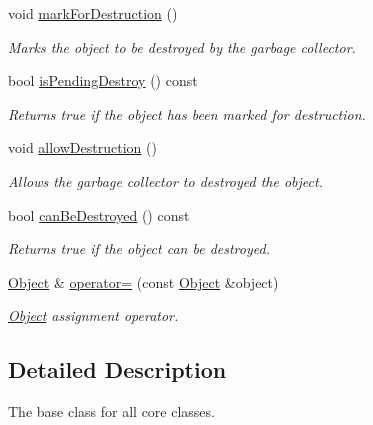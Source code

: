 \begin{DoxyCompactItemize}
void \mbox{\hyperlink{class_arcana_1_1_object_af08a90d6cc61992f2908e61b60a31972}{mark\+For\+Destruction}} ()
\begin{DoxyCompactList}\small\item\em Marks the object to be destroyed by the garbage collector. \end{DoxyCompactList}\item 
\mbox{\label{class_arcana_1_1_object_aa885d48e135268cc4198ccb550e151aa}} 
bool \mbox{\hyperlink{class_arcana_1_1_object_aa885d48e135268cc4198ccb550e151aa}{is\+Pending\+Destroy}} () const
\begin{DoxyCompactList}\small\item\em Returns true if the object has been marked for destruction. \end{DoxyCompactList}\item 
void \mbox{\hyperlink{class_arcana_1_1_object_abd84158043b5d90a1f1c5647c0f04b9f}{allow\+Destruction}} ()
\begin{DoxyCompactList}\small\item\em Allows the garbage collector to destroyed the object. \end{DoxyCompactList}\item 
\mbox{\label{class_arcana_1_1_object_a2cbe52bfff3d3c70e35a5de48d7081d4}} 
bool \mbox{\hyperlink{class_arcana_1_1_object_a2cbe52bfff3d3c70e35a5de48d7081d4}{can\+Be\+Destroyed}} () const
\begin{DoxyCompactList}\small\item\em Returns true if the object can be destroyed. \end{DoxyCompactList}\item 
\mbox{\label{class_arcana_1_1_object_acd005d9de1a1e009b9851901fd678ac3}} 
\mbox{\hyperlink{class_arcana_1_1_object}{Object}} \& \mbox{\hyperlink{class_arcana_1_1_object_acd005d9de1a1e009b9851901fd678ac3}{operator=}} (const \mbox{\hyperlink{class_arcana_1_1_object}{Object}} \&object)
\begin{DoxyCompactList}\small\item\em \mbox{\hyperlink{class_arcana_1_1_object}{Object}} assignment operator. \end{DoxyCompactList}\end{DoxyCompactItemize}


\subsection{Detailed Description}
The base class for all core classes. 




